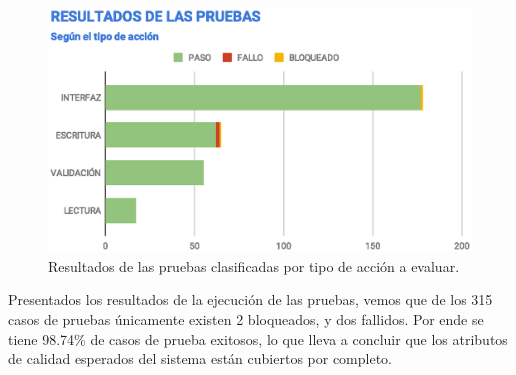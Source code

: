 \begin{figure}
\centering
\includegraphics[width=1.0\textwidth]{graphics/results-type.eps}
\caption{Resultados de las pruebas clasificadas por tipo de acción a evaluar.}
\label{results-type}
\end{figure}

Presentados los resultados de la ejecución de las pruebas, vemos que de los 315
casos de pruebas únicamente existen 2 bloqueados, y dos fallidos. Por ende se
tiene 98.74\% de casos de prueba exitosos, lo que lleva a concluir que los
atributos de calidad esperados del sistema están cubiertos por completo.

